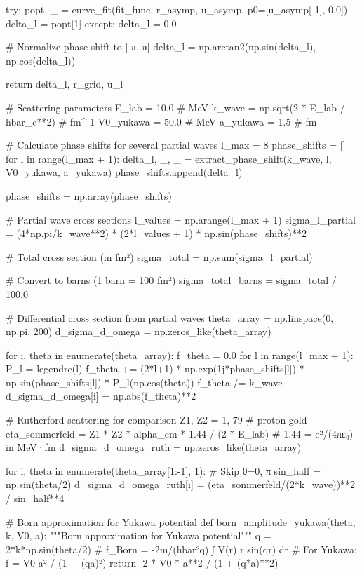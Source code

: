 \documentclass[a4paper, 11pt]{article}
\begin{document}
\begin{pycode}
    try:
        popt, _ = curve_fit(fit_func, r_asymp, u_asymp, p0=[u_asymp[-1], 0.0])
        delta_l = popt[1]
    except:
        delta_l = 0.0

    # Normalize phase shift to [-π, π]
    delta_l = np.arctan2(np.sin(delta_l), np.cos(delta_l))

    return delta_l, r_grid, u_l

# Scattering parameters
E_lab = 10.0  # MeV
k_wave = np.sqrt(2 * E_lab / hbar_c**2)  # fm^-1
V0_yukawa = 50.0  # MeV
a_yukawa = 1.5  # fm

# Calculate phase shifts for several partial waves
l_max = 8
phase_shifts = []
for l in range(l_max + 1):
    delta_l, _, _ = extract_phase_shift(k_wave, l, V0_yukawa, a_yukawa)
    phase_shifts.append(delta_l)

phase_shifts = np.array(phase_shifts)

# Partial wave cross sections
l_values = np.arange(l_max + 1)
sigma_l_partial = (4*np.pi/k_wave**2) * (2*l_values + 1) * np.sin(phase_shifts)**2

# Total cross section (in fm²)
sigma_total = np.sum(sigma_l_partial)

# Convert to barns (1 barn = 100 fm²)
sigma_total_barns = sigma_total / 100.0

# Differential cross section from partial waves
theta_array = np.linspace(0, np.pi, 200)
d_sigma_d_omega = np.zeros_like(theta_array)

for i, theta in enumerate(theta_array):
    f_theta = 0.0
    for l in range(l_max + 1):
        P_l = legendre(l)
        f_theta += (2*l+1) * np.exp(1j*phase_shifts[l]) * np.sin(phase_shifts[l]) * P_l(np.cos(theta))
    f_theta /= k_wave
    d_sigma_d_omega[i] = np.abs(f_theta)**2

# Rutherford scattering for comparison
Z1, Z2 = 1, 79  # proton-gold
eta_sommerfeld = Z1 * Z2 * alpha_em * 1.44 / (2 * E_lab)  # 1.44 = e²/(4πε₀) in MeV·fm
d_sigma_d_omega_ruth = np.zeros_like(theta_array)

for i, theta in enumerate(theta_array[1:-1], 1):  # Skip θ=0, π
    sin_half = np.sin(theta/2)
    d_sigma_d_omega_ruth[i] = (eta_sommerfeld/(2*k_wave))**2 / sin_half**4

# Born approximation for Yukawa potential
def born_amplitude_yukawa(theta, k, V0, a):
    """Born approximation for Yukawa potential"""
    q = 2*k*np.sin(theta/2)
    # f_Born = -2m/(hbar²q) ∫ V(r) r sin(qr) dr
    # For Yukawa: f = V0 a² / (1 + (qa)²)
    return -2 * V0 * a**2 / (1 + (q*a)**2)


\end{pycode}
\end{document}
